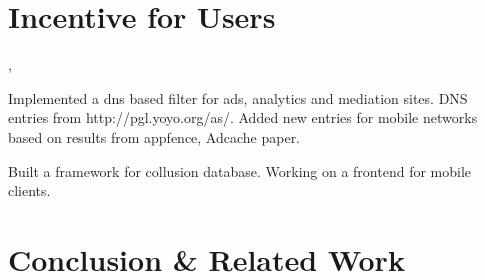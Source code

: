 \documentclass{sig-alternate-10pt}
\begin{document}
\section{Incentive for Users}

\cite{Leontiadis:2012:AdsMobile},
\cite{Vallina-rodriguez:2012:AdCache}
\cite{Hornyack:2011:AppFence}

\cite{collusion}

Implemented a dns based filter for ads, analytics and mediation sites.
DNS entries from http://pgl.yoyo.org/as/. Added new entries for
mobile networks based on results from appfence, Adcache paper.

Built a framework for collusion database. Working on a frontend for
mobile clients. 

\section{Conclusion \& Related Work}



\scriptsize


\normalsize
\end{document}
